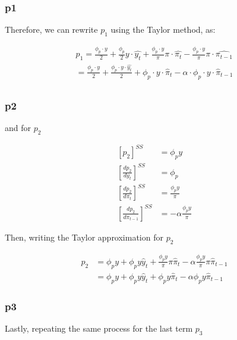 \documentclass[11pt,preprint, authoryear]{elsarticle}
\numberwithin{equation}{section}
\numberwithin{figure}{section}
\numberwithin{table}{section}
\begin{document}
\hypertarget{p1}{%
\subsubsection{p1}\label{p1}}

Therefore, we can rewrite \(p_{1}\) using the Taylor method, as:

\[\begin{aligned}
p_{1} = \frac{\phi_{p} \cdot y}{2} + \frac{\phi_{p}}{2} y \cdot \hat{y_{t}} + \frac{\phi_{p} \cdot y}{\pi} \pi \cdot \hat{\pi_{t}} - \frac{\phi_{p} \cdot y}{\pi}\pi \cdot \hat{\pi_{t-1}}\\
= \frac{\phi_{p} \cdot y}{2} + \frac{\phi_{p} \cdot y \cdot \hat{y_{t}} }{2} + \phi_{p} \cdot y \cdot \hat{\pi}_{t} - \alpha \cdot \phi_{p} \cdot y \cdot \hat{\pi}_{t-1} \\
\end{aligned}\]

\hypertarget{p2}{%
\subsubsection{p2}\label{p2}}

and for \(p_{2}\)

\[\begin{aligned}
\left[ p_{2} \right]^{SS} &= \phi_{p} y
\\
\left[ \frac{dp_{2}}{dy_{t}} \right]^{SS} &= \phi_{p}
\\
\left[ \frac{dp_{2}}{d\pi_{t}} \right]^{SS} &= \frac{\phi_{p} y}{\pi}
\\
\left[ \frac{dp_{2}}{d\pi_{t-1}} \right]^{SS} &= - \alpha \frac{\phi_{p} y}{\pi}
\end{aligned}\]

Then, writing the Taylor approximation for \(p_{2}\)

\[\begin{aligned}
p_{2} &= \phi_{p} y + \phi_{p} y \hat{y}_{t} + \frac{\phi_{p} y}{\pi} \pi \hat{\pi}_{t} - \alpha \frac{\phi_{p} y}{\pi} \pi \hat{\pi}_{t-1}\\
&= \phi_{p} y + \phi_{p} y \hat{y}_{t} + \phi_{p} y \hat{\pi}_{t} - \alpha \phi_{p} y \hat{\pi}_{t-1}
\end{aligned}\]

\hypertarget{p3}{%
\subsubsection{p3}\label{p3}}

Lastly, repeating the same process for the last term \(p_{3}\)
\end{document}
